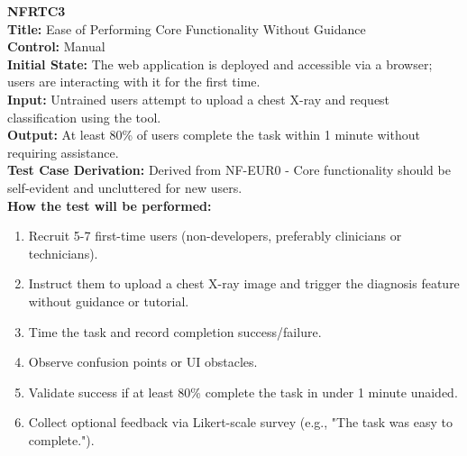 \documentclass[12pt, titlepage]{article}
\begin{document}
\textbf{NFRTC3}\\
\textbf{Title:} Ease of Performing Core Functionality Without Guidance\\
\textbf{Control:} Manual\\
\textbf{Initial State:} The web application is deployed and accessible via a browser; users are interacting with it for the first time.\\
\textbf{Input:} Untrained users attempt to upload a chest X-ray and request classification using the tool.\\
\textbf{Output:} At least 80\% of users complete the task within 1 minute without requiring assistance.\\
\textbf{Test Case Derivation:} Derived from NF-EUR0 - Core functionality should be self-evident and uncluttered for new users.\\
\textbf{How the test will be performed:}
\begin{enumerate}
  \item Recruit 5-7 first-time users (non-developers, preferably clinicians or technicians).
  \item Instruct them to upload a chest X-ray image and trigger the diagnosis feature without guidance or tutorial.
  \item Time the task and record completion success/failure.
  \item Observe confusion points or UI obstacles.
  \item Validate success if at least 80\% complete the task in under 1 minute unaided.
  \item Collect optional feedback via Likert-scale survey (e.g., "The task was easy to complete.").
\end{enumerate}

\vspace{1em}
\end{document}
